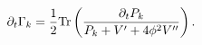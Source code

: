 \begin{equation}
\partial_t\Gamma_k=
{1\over2}\mathrm{Tr}\left(
{\partial_tP_k\over
P_k+V'+4\phi^2V''}
\right).
\end{equation}

